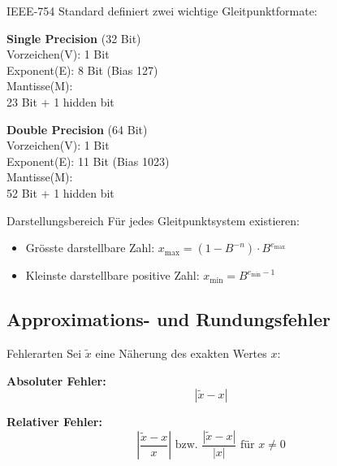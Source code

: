 \begin{concept}{IEEE-754 Standard} definiert zwei wichtige Gleitpunktformate:
\vspace{1mm}\\
\begin{minipage}[t]{0.5\textwidth}
    \textbf{Single Precision} (32 Bit)\\
    Vorzeichen(V): 1 Bit\\
    Exponent(E): 8 Bit (Bias 127)\\
    Mantisse(M): \\ 23 Bit + 1 hidden bit
\end{minipage}
\begin{minipage}[t]{0.48\textwidth}
    \textbf{Double Precision} (64 Bit)\\
    Vorzeichen(V): 1 Bit\\
    Exponent(E): 11 Bit (Bias 1023)\\
    Mantisse(M): \\ 52 Bit + 1 hidden bit
\end{minipage}
\end{concept}

\begin{theorem}{Darstellungsbereich}
Für jedes Gleitpunktsystem existieren:
\begin{itemize}
    \item Grösste darstellbare Zahl: \large{$x_{\text{max}} = (1-B^{-n}) \cdot B^{e_{\text{max}}}$}
    \item \normalsize{Kleinste darstellbare positive Zahl:} \large{$x_{\text{min}} = B^{e_{\text{min}}-1}$}
\end{itemize}
\end{theorem}

\subsection{Approximations- und Rundungsfehler}

\begin{definition}{Fehlerarten}
Sei $\tilde{x}$ eine Näherung des exakten Wertes $x$:
\vspace{1mm}\\
\begin{minipage}[t]{0.35\textwidth}
    \textbf{Absoluter Fehler:}  $$\left|\tilde{x}-x\right|$$
\end{minipage}
\hspace{3mm}
\begin{minipage}[t]{0.5\textwidth}
    \textbf{Relativer Fehler:}  $$\left|\frac{\tilde{x}-x}{x}\right| \text{ bzw. } \frac{|\tilde{x}-x|}{|x|} \text{ für } x \neq 0$$
\end{minipage}
\end{definition}


